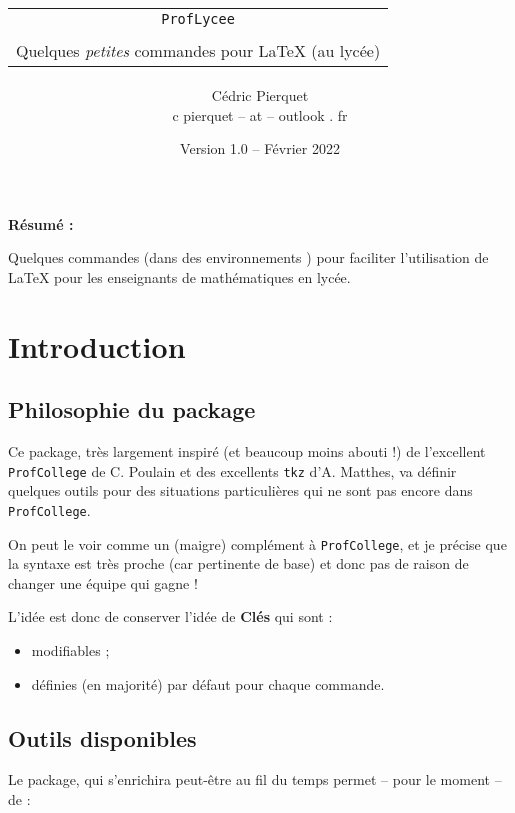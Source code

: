 \documentclass{article}
\title{%
\begin{minipage}{0.75\linewidth}
	\begin{tcolorbox}[colframe=yellow,colback=yellow!15]
		\begin{center}
			\begin{tabular}{c}
				\lstinline!ProfLycee!\\
				\\
				Quelques \textit{petites} commandes pour  \LaTeX{} (au lycée)
			\end{tabular}
		\end{center}
	\end{tcolorbox}
\end{minipage}
}
\author{
	\begin{tabular}{c}
		Cédric Pierquet\\
		{\ttfamily c pierquet -- at -- outlook . fr}
	\end{tabular}
}
\date{Version 1.0 -- Février 2022}
\newcommand\Cle[1]{{\bfseries\sffamily\textlangle #1\textrangle}}
\begin{document}
\thispagestyle{empty}

\maketitle

{\Large \bfseries Résumé : }

\medskip

\noindent Quelques commandes (dans des environnements \TikZ) pour faciliter l'utilisation
	de \LaTeX{} pour les enseignants de mathématiques en lycée.\\

\bigskip

\tableofcontents

\newpage

\section{Introduction}

\subsection{\og Philosophie \fg{} du package}

Ce \textsf{package}, très largement inspiré (et beaucoup moins abouti !) de l'excellent \lstinline!ProfCollege! de C. Poulain et des excellents \lstinline!tkz! d'A. Matthes, va définir quelques outils pour des situations particulières qui ne sont pas encore dans \lstinline!ProfCollege!.

On peut le voir comme un (maigre) complément à \lstinline!ProfCollege!, et je précise que la syntaxe est très proche (car pertinente de base) et donc pas de raison de changer une équipe qui gagne !

\medskip

L'idée est donc de conserver l'idée de \Cle{Clés} qui sont :
%
\begin{itemize}
	\item modifiables ;
	\item définies (en majorité) par défaut pour chaque commande.
\end{itemize}

\subsection{Outils disponibles}

Le \textsf{package}, qui s'enrichira peut-être au fil du temps permet -- pour le moment -- de :
\end{document}
